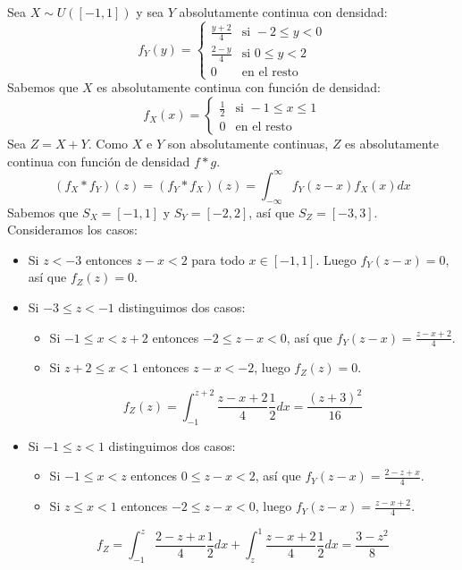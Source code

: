 \begin{example}
    Sea $X \sim U([-1, 1])$ y sea $Y$ absolutamente continua con densidad:
    $$f_Y(y) = \begin{cases}
            \frac{y+2}{4} & \text{si } -2 \leq y < 0 \\
            \frac{2-y}{4} & \text{si } 0 \leq y < 2  \\
            0             & \text{en el resto}
        \end{cases}$$
    Sabemos que $X$ es absolutamente continua con función de densidad:
    $$f_X(x) = \begin{cases}
            \frac{1}{2} & \text{si } -1 \leq x \leq 1 \\
            0           & \text{en el resto}
        \end{cases}$$
    Sea $Z = X+Y$.
    Como $X$ e $Y$ son absolutamente continuas, $Z$ es absolutamente continua con función de densidad $f \ast g$.
    $$(f_X \ast f_Y)(z) = (f_Y \ast f_X)(z) = \int_{-\infty}^\infty f_Y(z-x) f_X(x) dx$$
    Sabemos que $S_X = [-1 ,1]$ y $S_Y = [-2, 2]$, así que $S_Z = [-3, 3]$.
    Consideramos los casos:
    \begin{itemize}
        \item Si $z < -3$ entonces $z-x < 2$ para todo $x \in [-1, 1]$.
              Luego $f_Y(z-x) = 0$, así que $f_Z(z) = 0$.
        \item Si $-3 \leq z < -1$ distinguimos dos casos:
              \begin{itemize}
                  \item Si $-1 \leq x < z+2$ entonces $-2 \leq z-x < 0$, así que $f_Y(z-x) = \frac{z-x+2}{4}$.
                  \item Si $z+2 \leq x < 1$ entonces $z-x < -2$, luego $f_Z(z) = 0$.
              \end{itemize}
              $$f_Z(z) = \int_{-1}^{z+2} \frac{z-x+2}{4} \frac{1}{2} dx = \frac{(z+3)^2}{16}$$
        \item Si $-1 \leq z < 1$ distinguimos dos casos:
              \begin{itemize}
                  \item Si $-1 \leq x < z$ entonces $0 \leq z-x < 2$, así que $f_Y(z-x) = \frac{2-z+x}{4}$.
                  \item Si $z \leq x < 1$ entonces $-2 \leq z-x < 0$, luego $f_Y(z-x) = \frac{z-x+2}{4}$.
              \end{itemize}
              $$f_Z = \int_{-1}^z \frac{2-z+x}{4} \frac{1}{2} dx + \int_z^1 \frac{z-x+2}{4} \frac{1}{2} dx = \frac{3-z^2}{8}$$

\end{itemize}
\end{example}
